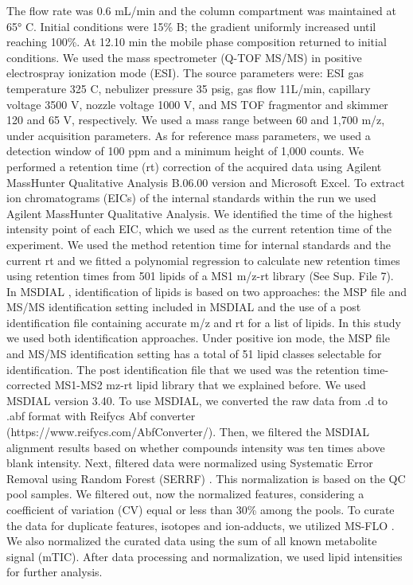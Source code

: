 \documentclass[9pt,twocolumn,twoside,lineno]{biorxiv}
\begin{document}
The flow rate was 0.6 mL/min and the column compartment was maintained at 65° C. Initial conditions were 15\% B; the gradient uniformly increased until reaching 100\%. 
At 12.10 min the mobile phase composition returned to initial conditions.
We used the mass spectrometer (Q-TOF MS/MS) in positive electrospray ionization mode (ESI).
The source parameters were: ESI gas temperature 325 \degree C, nebulizer pressure 35 psig, gas flow 11L/min, capillary voltage 3500 V, nozzle voltage 1000 V, and MS TOF fragmentor and skimmer 120 and 65 V, respectively.
We used a mass range between 60 and 1,700 m/z, under acquisition parameters. 
As for reference mass parameters, we used a detection window of 100 ppm and a minimum height of 1,000 counts. 
We performed a retention time (rt) correction of the acquired data using Agilent MassHunter Qualitative Analysis B.06.00 version and Microsoft Excel. 
To extract ion chromatograms (EICs) of the internal standards within the run we used Agilent MassHunter Qualitative Analysis.
We identified the time of the highest intensity point of each EIC, which we used as the current retention time of the experiment. 
We used the method retention time for internal standards and the current rt and we fitted a polynomial regression to calculate new retention times using retention times from 501 lipids of a MS1 m/z-rt library (See Sup. File 7). 
In MSDIAL \cite{Tsugawa2015-kh}, identification of lipids is based on two approaches: the MSP file and MS/MS identification setting included in MSDIAL and the use of a post identification file containing accurate m/z and rt for a list of lipids. 
In this study we used both identification approaches. 
Under positive ion mode, the MSP file and MS/MS identification setting has a total of 51 lipid classes  selectable for identification. 
The post identification file that we used was the retention time-corrected MS1-MS2 mz-rt lipid library that we explained before. 
We used MSDIAL \cite{Tsugawa2015-kh} version 3.40. 
To use MSDIAL, we converted the raw data from .d to .abf format with Reifycs Abf converter (https://www.reifycs.com/AbfConverter/). 
Then, we filtered the MSDIAL alignment results based on whether compounds intensity was ten times above blank intensity. Next, filtered data were normalized using Systematic Error Removal using Random Forest (SERRF) \cite{Fan2019}. This normalization is based on the QC pool samples. 
We filtered out, now the normalized features, considering a coefficient of variation (CV) equal or less than 30\% among the pools. 
To curate the data for duplicate features, isotopes and ion-adducts, we utilized MS-FLO \cite{DeFelice2017-ms}.
We also normalized the curated data using the sum of all known metabolite signal (mTIC). 
After data processing and normalization, we used lipid intensities for further analysis.
\end{document}

